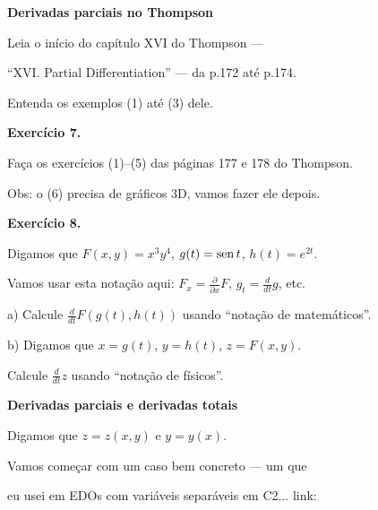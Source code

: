 \documentclass[oneside,12pt]{article}
\begin{document}
\newpage


{\bf Derivadas parciais no Thompson}

Leia o início do capítulo XVI do Thompson ---

``XVI. Partial Differentiation'' --- da p.172 até p.174.

Entenda os exemplos (1) até (3) dele.

\bsk

{\bf Exercício 7.}

Faça os exercícios (1)--(5) das páginas 177 e 178 do Thompson.

Obs: o (6) precisa de gráficos 3D, vamos fazer ele depois.

\bsk

{\bf Exercício 8.}

\def\ppx{\frac{∂}{∂x}}
\def\ddt{\frac{d}{dt}}

Digamos que $F(x,y) = x^3y^4$, $g(t) = \operatorname{sen} t$, $h(t) = e^{2t}$.

Vamos usar esta notação aqui: $F_x = \frac{∂}{∂x}F$, $g_t=\frac{d}{dt}g$, etc.

\ssk

a) Calcule $\ddt F(g(t),h(t))$ usando ``notação de matemáticos''.

\ssk

b) Digamos que $x=g(t)$, $y=h(t)$, $z=F(x,y)$.

Calcule $\frac{d}{dt}z$ usando ``notação de físicos''.

\newpage



{\bf Derivadas parciais e derivadas totais}

Digamos que $z = z(x,y)$ e $y = y(x)$.

\msk

Vamos começar com um caso bem concreto --- um que

eu usei em EDOs com variáveis separáveis em C2... link:
\ssk
\end{document}
